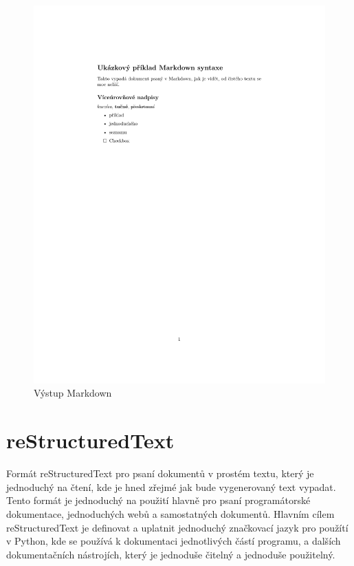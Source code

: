 \begin{figure}[h]
    \centering
    \includegraphics[width=\textwidth]{example.pdf}
    \caption{Výstup Markdown}
    \label{fig:markdown}
\end{figure}

\section{reStructuredText}

Formát reStructuredText pro psaní dokumentů v prostém textu, který je jednoduchý na čtení, kde je hned zřejmé jak bude vygenerovaný text vypadat.
Tento formát je jednoduchý na použití hlavně pro psaní programátorské dokumentace, jednoduchých webů a samostatných dokumentů.
Hlavním cílem reStructuredText je definovat a uplatnit jednoduchý značkovací jazyk pro použítí v Python, kde se používá k dokumentaci jednotlivých částí programu,
a dalších dokumentačních nástrojích, který je jednoduše čitelný a jednoduše použitelný. \cite{reStruDoc}

